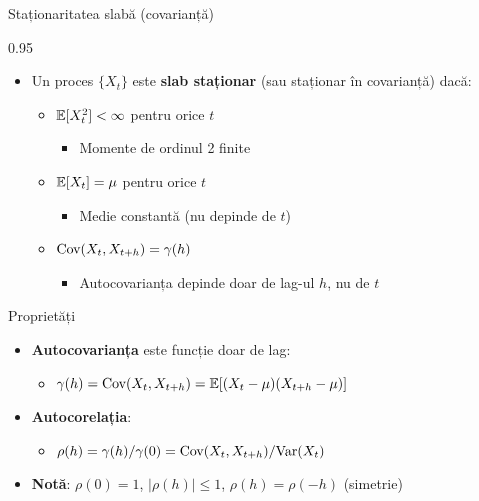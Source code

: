 \documentclass[9pt, aspectratio=169, t]{beamer}
\begin{document}
\begin{frame}{Staționaritatea slabă (covarianță)}
    \begin{cminipage}{0.95\textwidth}
        \small
        \begin{defn}
            \begin{itemize}\setlength{\itemsep}{0pt}
                \item Un proces $\{X_t\}$ este \textbf{slab staționar} (sau staționar în covarianță) dacă:
                \begin{itemize}\setlength{\itemsep}{0pt}
                    \item $\mathbb{E}[X_t^2] < \infty$ pentru orice $t$
                    \begin{itemize}
                        \item Momente de ordinul 2 finite
                    \end{itemize}
                    \item $\mathbb{E}[X_t] = \mu$ pentru orice $t$
                    \begin{itemize}
                        \item Medie constantă (nu depinde de $t$)
                    \end{itemize}
                    \item $\text{Cov}(X_t, X_{t+h}) = \gamma(h)$
                    \begin{itemize}
                        \item Autocovarianța depinde doar de lag-ul $h$, nu de $t$
                    \end{itemize}
                \end{itemize}
            \end{itemize}
        \end{defn}
        \vspace{-2mm}
        \begin{block}{Proprietăți}
            \begin{itemize}\setlength{\itemsep}{0pt}
                \item \textbf{Autocovarianța} este funcție doar de lag:
                \begin{itemize}
                    \item $\gamma(h) = \text{Cov}(X_t, X_{t+h}) = \mathbb{E}[(X_t - \mu)(X_{t+h} - \mu)]$
                \end{itemize}
                \item \textbf{Autocorelația}:
                \begin{itemize}
                    \item $\rho(h) = \gamma(h)/\gamma(0) = \text{Cov}(X_t, X_{t+h})/\text{Var}(X_t)$
                \end{itemize}
                \item \textbf{Notă}: $\rho(0) = 1$, $|\rho(h)| \leq 1$, $\rho(h) = \rho(-h)$ (simetrie)
            \end{itemize}
        \end{block}
    \end{cminipage}
\end{frame}
\end{document}
